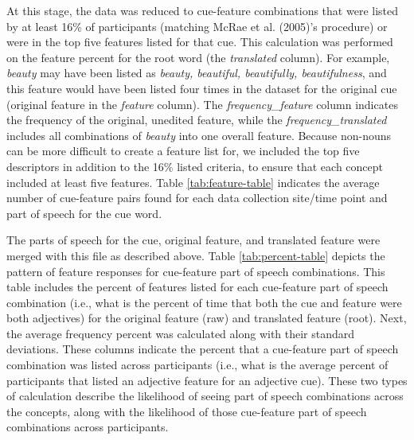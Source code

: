 \documentclass[english,,man]{apa6}
\theoremstyle{definition}
\theoremstyle{definition}
\theoremstyle{definition}
\theoremstyle{remark}
\begin{document}
At this stage, the data was reduced to cue-feature combinations that
were listed by at least 16\% of participants (matching McRae et al.
(2005)'s procedure) or were in the top five features listed for that
cue. This calculation was performed on the feature percent for the root
word (the \emph{translated} column). For example, \emph{beauty} may have
been listed as \emph{beauty, beautiful, beautifully, beautifulness}, and
this feature would have been listed four times in the dataset for the
original cue (original feature in the \emph{feature} column). The
\emph{frequency\_feature} column indicates the frequency of the
original, unedited feature, while the \emph{frequency\_translated}
includes all combinations of \emph{beauty} into one overall feature.
Because non-nouns can be more difficult to create a feature list for, we
included the top five descriptors in addition to the 16\% listed
criteria, to ensure that each concept included at least five features.
Table \ref{tab:feature-table} indicates the average number of
cue-feature pairs found for each data collection site/time point and
part of speech for the cue word.

The parts of speech for the cue, original feature, and translated
feature were merged with this file as described above. Table
\ref{tab:percent-table} depicts the pattern of feature responses for
cue-feature part of speech combinations. This table includes the percent
of features listed for each cue-feature part of speech combination
(i.e., what is the percent of time that both the cue and feature were
both adjectives) for the original feature (raw) and translated feature
(root). Next, the average frequency percent was calculated along with
their standard deviations. These columns indicate the percent that a
cue-feature part of speech combination was listed across participants
(i.e., what is the average percent of participants that listed an
adjective feature for an adjective cue). These two types of calculation
describe the likelihood of seeing part of speech combinations across the
concepts, along with the likelihood of those cue-feature part of speech
combinations across participants.
\end{document}
